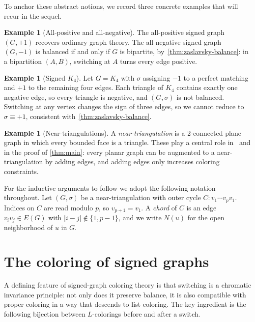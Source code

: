 \documentclass[11pt,a4paper]{article}
\theoremstyle{plain}
\theoremstyle{definition}
\newtheorem{example}[theorem]{Example}
\newcommand{\E}{E}
\newcommand{\Gs}{(G,\sigma)}
\begin{document}
To anchor these abstract notions, we record three concrete examples
that will recur in the sequel.

\begin{example}[All-positive and all-negative]\label{ex:plus-minus}
The all-positive signed graph $(G,+1)$ recovers ordinary graph
theory. The all-negative signed graph $(G,-1)$ is balanced if and
only if $G$ is bipartite, by~\cref{thm:zaslavsky-balance}: in a
bipartition $(A,B)$, switching at $A$ turns every edge positive.
\end{example}

\begin{example}[Signed $K_4$]\label{ex:K4-pre}
Let $G=K_4$ with $\sigma$ assigning $-1$ to a perfect matching and
$+1$ to the remaining four edges. Each triangle of $K_4$ contains
exactly one negative edge, so every triangle is negative, and $\Gs$
is not balanced. Switching at any vertex changes the sign of three
edges, so we cannot reduce to $\sigma\equiv+1$, consistent
with~\cref{thm:zaslavsky-balance}.
\end{example}

\begin{example}[Near-triangulations]\label{ex:near-tri}
A \emph{near-triangulation} is a $2$-connected plane graph in which
every bounded face is a triangle. These play a central role
in~\cite{Thomassen1994} and in the proof of \cref{thm:main}: every
planar graph can be augmented to a near-triangulation by adding
edges, and adding edges only increases coloring constraints.
\end{example}

For the inductive arguments to follow we adopt the following
notation throughout. Let $\Gs$ be a near-triangulation with outer
cycle $C\colon v_1\cdots v_pv_1$. Indices on $C$ are read modulo
$p$, so $v_{p+1}=v_1$. A \emph{chord} of $C$ is an edge
$v_iv_j\in\E(G)$ with $|i-j|\notin\{1,p-1\}$, and we write $N(u)$
for the open neighborhood of $u$ in $G$.

\section{The coloring of signed graphs}\label{sec:coloring}

A defining feature of signed-graph coloring theory is that
switching is a chromatic invariance principle: not only does it
preserve balance, it is also compatible with proper coloring
in a way that descends to list coloring. The key ingredient is the
following bijection between $L$-colorings before and after a
switch.
\end{document}
